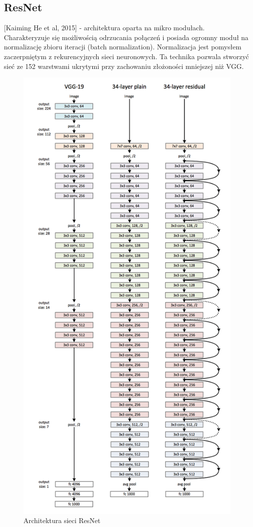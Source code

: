 \documentclass[12pt,a4paper,twoside,titlepage,openright]{book}
\begin{document}
\subsection{ResNet}
[Kaiming He et al, 2015]  - architektura oparta na mikro modułach. Charakteryzuje się możliwością odrzucania połączeń i posiada ogromny moduł na normalizację zbioru iteracji (batch normalization). Normalizacja jest pomysłem zaczerpniętym z rekurencyjnych sieci neuronowych. Ta technika pozwala stworzyć sieć ze 152 warstwami ukrytymi przy zachowaniu złożoności mniejszej niż VGG. \cite{DBLP:journals/corr/XieGDTH16}
\begin{figure}[h]
	\centering
			\includegraphics[resolution=120]{ResNet.png}
		\caption{Architektura sieci ResNet}
\end{figure}
\end{document}

